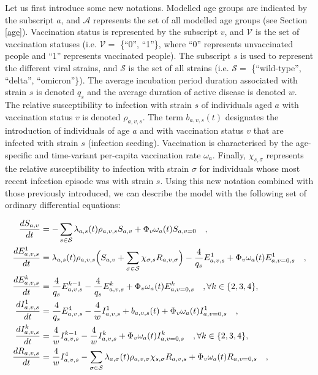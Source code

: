 Let us first introduce some new notations. Modelled age groups are indicated by the subscript $a$, and $\mathcal{A}$ represents
the set of all modelled age groups (see Section \ref{age}). Vaccination status is represented by the subscript $v$, and $\mathcal{V}$ is the set of 
vaccination statuses (i.e. $\mathcal{V}=$ \{``0'', ``1''\}, where ``0'' represents unvaccinated people and ``1'' represents vaccinated people). The subscript $s$ is used to represent the different viral strains, and $\mathcal{S}$ is the set 
of all strains (i.e. $\mathcal{S}=$ \{``wild-type'', ``delta'', ``omicron''\}). The average incubation period duration associated with strain $s$ is denoted $q_s$ and
the average duration of active disease is denoted $w$. The relative susceptibility to infection with strain $s$ of individuals aged $a$ with 
vaccination status $v$ is denoted $\rho_{a,v,s}$. The term $b_{a,v,s}(t)$ designates the introduction of individuals of age $a$ and 
with vaccination status $v$ that are infected with strain $s$ (infection seeding). Vaccination is characterised by the age-specific
and time-variant per-capita vaccination rate $\omega_a$. Finally, $\chi_{s,\sigma}$ represents the relative susceptibility to infection
with strain $\sigma$ for individuals whose most recent infection episode was with strain $s$. Using this new notation combined 
with those previously introduced, we can describe the model with the following set of ordinary differential equations:

\begin{equation}
    \label{ode}
    \begin{split}
\frac{dS_{a,v}}{dt} & = -\sum_{s \in \mathcal{S}} \lambda_{a,s}(t)\rho_{a,v,s} S_{a,v} + \Phi_v\omega_a(t)S_{a,v=0}  \quad , \\
\frac{dE_{a,v,s}^{1}}{dt} & =\lambda_{a,s}(t)\rho_{a,v,s} \Bigl(S_{a,v}  +  \sum_{\sigma \in \mathcal{S}} \chi_{\sigma, s} R_{a,v,\sigma} \Bigr) - \frac{4}{q_{s}}E_{a,v,s}^{1} + \Phi_v\omega_a(t)E_{a,v=0,s}^1 \quad , \\
\frac{dE_{a,v,s}^{k}}{dt} & = \frac{4}{q_{s}}E_{a,v,s}^{k-1} - \frac{4}{q_{s}}E_{a,v,s}^{k} + \Phi_v\omega_a(t)E_{a,v=0,s}^k \quad,  \forall k \in \{2,3,4\} , \\
\frac{dI_{a,v,s}^{1}}{dt} & = \frac{4}{q_{s}}E_{a,v,s}^{4} - \frac{4}{w}I_{a,v,s}^{1} + b_{a,v,s}(t) + \Phi_v\omega_a(t)I_{a,v=0,s}^1 \quad , \\
\frac{dI_{a,v,s}^{k}}{dt} & = \frac{4}{w}I_{a,v,s}^{k-1} - \frac{4}{w}I_{a,v,s}^{k} + \Phi_v\omega_a(t)I_{a,v=0,s}^k \quad, \forall k \in \{2,3,4\} , \\
\frac{dR_{a,v,s}}{dt} & = \frac{4}{w}I_{a,v,s}^{4} - \sum _{\sigma \in \mathcal{S}} \lambda_{a,\sigma}(t)\rho_{a,v,\sigma} \chi_{s, \sigma} R_{a,v, s} + \Phi_v\omega_a(t)R_{a,v=0,s} \quad, 
    \end{split}
\end{equation}

